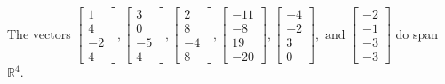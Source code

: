 \begin{exercise}
\begin{exerciseStatement}
  \end{exerciseStatement}
  \begin{exerciseAnswer}
   The vectors \(\left[\begin{array}{r}
1 \\
4 \\
-2 \\
4
\end{array}\right] , \left[\begin{array}{r}
3 \\
0 \\
-5 \\
4
\end{array}\right] , \left[\begin{array}{r}
2 \\
8 \\
-4 \\
8
\end{array}\right] , \left[\begin{array}{r}
-11 \\
-8 \\
19 \\
-20
\end{array}\right] , \left[\begin{array}{r}
-4 \\
-2 \\
3 \\
0
\end{array}\right] , \text{ and } \left[\begin{array}{r}
-2 \\
-1 \\
-3 \\
-3
\end{array}\right]\) 
  	 do  
	span \(\mathbb{R}^4\).
  


  \end{exerciseAnswer}
\end{exercise}